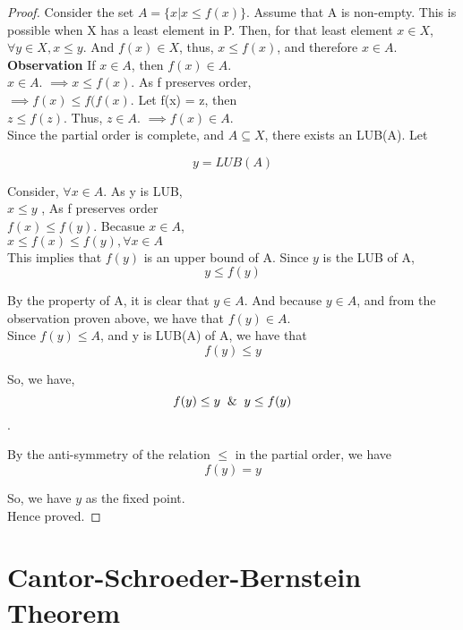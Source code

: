 \begin{proof}
Consider the set $A = \{x | x \le f(x)\}$. Assume that A is non-empty. This is possible when X has a least element in P. Then, for that least element $x \in X$, $\forall y \in X, x \le y$. And $f(x) \in X$, thus, $x \le f(x)$, and therefore $x \in A$. \\

\textbf{Observation} If $x \in A$, then $f(x) \in A$. \\
$x \in A$. $\implies x \le f(x)$. As f preserves order,\\
$ \implies f(x) \le f(f(x) $. Let f(x) = z, then \\
$z \le f(z)$. Thus, $z \in A$. $\implies f(x) \in A$.\\

Since the partial order is complete, and $A \subseteq X$, there exists an LUB(A). Let

$$ y = LUB(A)$$

Consider, $\forall x \in A$. As y is LUB,\\
$x \le y$ , As f preserves order\\
$ f(x) \le f(y) $. Becasue $x \in A$, \\

$x \le f(x) \le f(y), \forall x \in A$ \\

This implies that $f(y)$ is an upper bound of A. Since $y$ is the LUB of A,
$$y \le f(y) $$

By the property of A, it is clear that $y \in A$. And because $y \in A$, and from the observation proven above, we have that $f(y) \in A$. \\

Since $f(y) \le A$, and y is LUB(A) of A, we have that
$$ f(y) \le y $$

So, we have,
$$ f(y) \le y \And y \le f(y) $$.

By the anti-symmetry of the relation $\le$ in the partial order, we have 
$$f(y) = y $$

So, we have $y$ as the fixed point.\\

Hence proved.

\end{proof}


\section{Cantor-Schroeder-Bernstein Theorem}

